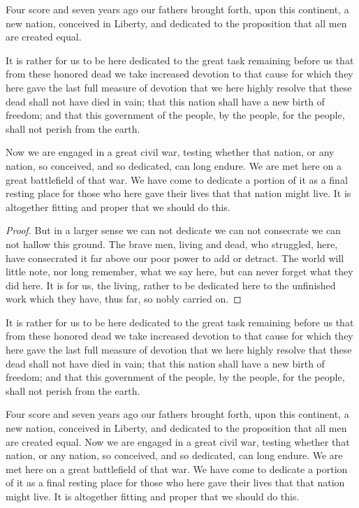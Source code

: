 \documentclass{roffin}
\begin{document}
Four score and seven years ago our fathers brought forth,
upon this continent, a new nation, conceived in Liberty, and dedicated to
the proposition that all men are created equal.

\begin{lemma}\label{lemma1}
It is rather for us to be here dedicated to the great task remaining before us that
from these honored dead we take increased devotion to that cause for which they here gave the last full measure of devotion that
we here highly resolve that these dead shall not have died in vain; that this nation shall have a new birth of freedom; and that this
government of the people, by the people, for the people, shall not perish from the earth.
\end{lemma}

Now we are engaged in a great civil war, testing whether that nation, or any nation, so conceived, and so dedicated, can long endure.
We are met here on a great battlefield of that war. We have come to dedicate a portion of it as a final resting place for those who
here gave their lives that that nation might live. It is altogether fitting and proper that we should do this.

\begin{proof}
But in a larger sense we can not dedicate we can not consecrate we can not hallow this ground. The brave men, living and dead,
who struggled, here, have consecrated it far above our poor power to add or detract. The world will little note, nor long remember,
what we say here, but can never forget what they did here. It is for us, the living, rather to be dedicated here to the unfinished work
which they have, thus far, so nobly carried on.
\end{proof}

It is rather for us to be here dedicated to the great task remaining before us that
from these honored dead we take increased devotion to that cause for which they here gave the last full measure of devotion that
we here highly resolve that these dead shall not have died in vain; that this nation shall have a new birth of freedom; and that this
government of the people, by the people, for the people, shall not perish from the earth.

\begin{example}
Four score and seven years ago our fathers brought forth,
upon this continent, a new nation, conceived in Liberty, and dedicated to
the proposition that all men are created equal.
Now we are engaged in a great civil war, testing whether that nation, or any nation, so conceived, and so dedicated, can long endure.
We are met here on a great battlefield of that war. We have come to dedicate a portion of it as a final resting place for those who
here gave their lives that that nation might live. It is altogether fitting and proper that we should do this.
\end{example}
\end{document}
